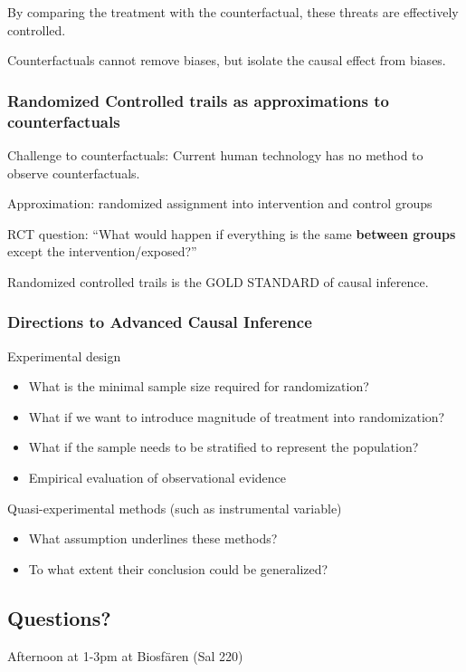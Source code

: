 \documentclass[
  letterpaper,
  DIV=11,
  numbers=noendperiod]{scrartcl}
\begin{document}
By comparing the treatment with the counterfactual, these threats are
effectively controlled.

Counterfactuals cannot remove biases, but isolate the causal effect from
biases.

\subsubsection{Randomized Controlled trails as approximations to
counterfactuals}\label{randomized-controlled-trails-as-approximations-to-counterfactuals}

Challenge to counterfactuals: Current human technology has no method to
observe counterfactuals.

Approximation: randomized assignment into intervention and control
groups

RCT question: ``What would happen if everything is the same
\textbf{between groups} except the intervention/exposed?''

Randomized controlled trails is the GOLD STANDARD of causal inference.

\subsubsection{Directions to Advanced Causal
Inference}\label{directions-to-advanced-causal-inference}

Experimental design

\begin{itemize}
\item
  What is the minimal sample size required for randomization?
\item
  What if we want to introduce magnitude of treatment into
  randomization?
\item
  What if the sample needs to be stratified to represent the population?
\item
  Empirical evaluation of observational evidence
\end{itemize}

Quasi-experimental methods (such as instrumental variable)

\begin{itemize}
\item
  What assumption underlines these methods?
\item
  To what extent their conclusion could be generalized?
\end{itemize}

\subsection{Questions?}\label{questions}

Afternoon at 1-3pm at Biosfären (Sal 220)
\end{document}
